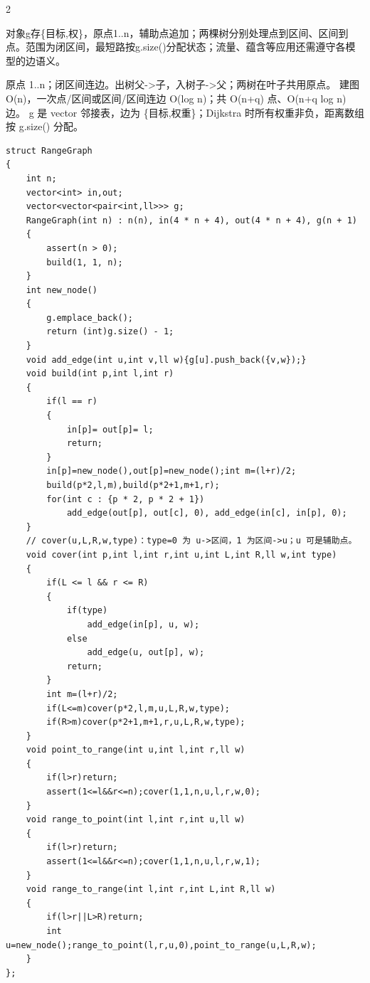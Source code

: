 \documentclass[UTF8,fontset=fandol,a4paper,twoside]{ctexart}
\newcommand{\note}[1]{{\fontsize{10}{12}\selectfont #1\par}}
\begin{document}
\begin{multicols}{2}
\note{对象g存\{目标,\allowbreak{}权\}，原点1.\allowbreak{}.\allowbreak{}n，辅助点追加；两棵树分别处理点到区间、区间到点。范围为闭区间，最短路按g.\allowbreak{}size(\allowbreak{})\allowbreak{}分配状态；流量、蕴含等应用还需遵守各模型的边语义。}
\note{原点 1.\allowbreak{}.\allowbreak{}n；闭区间连边。出树父-\allowbreak{}>\allowbreak{}子，入树子-\allowbreak{}>\allowbreak{}父；两树在叶子共用原点。 建图 O(\allowbreak{}n)\allowbreak{}，一次点/\allowbreak{}区间或区间/\allowbreak{}区间连边 O(\allowbreak{}log n)\allowbreak{}；共 O(\allowbreak{}n+\allowbreak{}q)\allowbreak{} 点、O(\allowbreak{}n+\allowbreak{}q log n)\allowbreak{} 边。 g 是 vector 邻接表，边为 \{目标,\allowbreak{}权重\}；Dijkstra 时所有权重非负，距离数组按 g.\allowbreak{}size(\allowbreak{})\allowbreak{} 分配。}
\begin{lstlisting}
struct RangeGraph
{
    int n;
    vector<int> in,out;
    vector<vector<pair<int,ll>>> g;
    RangeGraph(int n) : n(n), in(4 * n + 4), out(4 * n + 4), g(n + 1)
    {
        assert(n > 0);
        build(1, 1, n);
    }
    int new_node()
    {
        g.emplace_back();
        return (int)g.size() - 1;
    }
    void add_edge(int u,int v,ll w){g[u].push_back({v,w});}
    void build(int p,int l,int r)
    {
        if(l == r)
        {
            in[p]= out[p]= l;
            return;
        }
        in[p]=new_node(),out[p]=new_node();int m=(l+r)/2;
        build(p*2,l,m),build(p*2+1,m+1,r);
        for(int c : {p * 2, p * 2 + 1})
            add_edge(out[p], out[c], 0), add_edge(in[c], in[p], 0);
    }
    // cover(u,L,R,w,type)：type=0 为 u->区间，1 为区间->u；u 可是辅助点。
    void cover(int p,int l,int r,int u,int L,int R,ll w,int type)
    {
        if(L <= l && r <= R)
        {
            if(type)
                add_edge(in[p], u, w);
            else
                add_edge(u, out[p], w);
            return;
        }
        int m=(l+r)/2;
        if(L<=m)cover(p*2,l,m,u,L,R,w,type);
        if(R>m)cover(p*2+1,m+1,r,u,L,R,w,type);
    }
    void point_to_range(int u,int l,int r,ll w)
    {
        if(l>r)return;
        assert(1<=l&&r<=n);cover(1,1,n,u,l,r,w,0);
    }
    void range_to_point(int l,int r,int u,ll w)
    {
        if(l>r)return;
        assert(1<=l&&r<=n);cover(1,1,n,u,l,r,w,1);
    }
    void range_to_range(int l,int r,int L,int R,ll w)
    {
        if(l>r||L>R)return;
        int u=new_node();range_to_point(l,r,u,0),point_to_range(u,L,R,w);
    }
};
\end{lstlisting}

\end{multicols}
\end{document}
